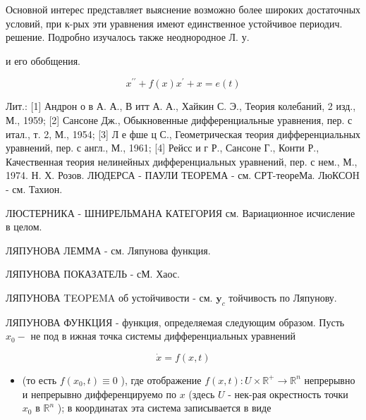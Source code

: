 \documentclass[10pt]{article}
\begin{document}
Основной интерес представляет выяснение возможно более широких достаточных условий, при к-рых эти уравнения имеют единственное устойчивое периодич. решение. Подробно изучалось также неоднородное Л. у.



и его обобщения.



\[

x^{\prime \prime}+f(x) x^{\prime}+x=e(t)

\]



Лит.: [1] Андрон о в А. А., В итт А. А., Хайкин С. Э., Теория колебаний, 2 изд., М., 1959; [2] Сансоне Дж., Обыкновенные дифференциальные уравнения, пер. с итал., т. 2, М., 1954; [3] Л е фше ц С., Геометрическая теория дифференциальных уравнений, пер. с англ., М., 1961; [4] Рейсс и г Р., Сансоне Г., Конти Р., Качественная теория нелинейных дифференциальных уравнений, пер. с нем., М., 1974. Н. Х. Розов. ЛЮДЕРСА - ПАУЛИ ТЕОРЕМА - см. СРТ-теореМа. ЛюКСОH - см. Тахион.



ЛЮСТЕРНИКА - ШНИРЕЛЬМАНА КАТЕГОРИЯ см. Вариационное исчисление в целом.



ЛЯПУНОВА ЛЕММА - см. Ляпунова функция.



ЛЯПУНОВА ПОКАЗАТЕЛЬ - сМ. Хаос.



ЛЯПУНОВА TEOPEMA об устойчивости - см. $\boldsymbol{y}_{c}$ тойчивость по Ляпунову.



ЛЯПУНОВА ФУНКЦИЯ - функция, определяемая следующим образом. Пусть $x_{0}-$ не под в ижная точка системы дифференциальных уравнений



\[

\dot{x}=f(x, t)

\]



\begin{itemize}

  \item (то есть $f\left(x_{0}, t\right) \equiv 0$ ), где отображение $f(x, t): U \times \mathbb{R}^{+} \rightarrow \mathbb{R}^{n}$ непрерывно и непрерывно дифференцируемо по $x$ (здесь $U$ - нек-рая окрестность точки $x_{0}$ в $\mathbb{R}^{n}$ ); в координатах эта система записывается в виде

\end{itemize}
\end{document}
